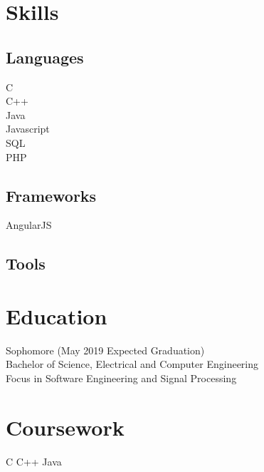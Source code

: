 \documentclass{cv_class}
\begin{document}
\begin{multicols}{2}
[
]

\raggedleft

\section{Skills}
    \subsection{Languages}
    C           \\
    C++         \\
    Java        \\
    Javascript  \\
    SQL \basic  \\
    PHP \basic  \\
    \subsection{Frameworks}
    AngularJS   \\
    \subsection{Tools}

\columnbreak
\raggedright

\section{Education}
Sophomore (May 2019 Expected Graduation) \\
Bachelor of Science, Electrical and Computer Engineering \\
Focus in Software Engineering and Signal Processing \\

\section{Coursework}
\bullets
{C}
{C++}
{Java}

\end{multicols}
\end{document}
